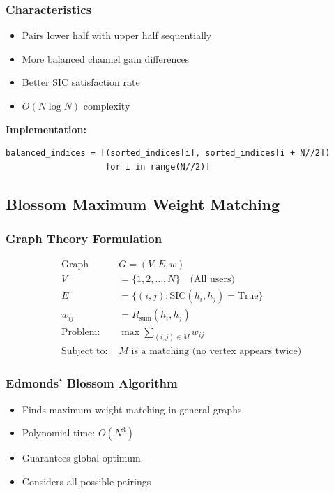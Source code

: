 \documentclass[12pt,a4paper]{article}
\begin{document}
\subsubsection{Characteristics}

\begin{itemize}
    \item Pairs lower half with upper half sequentially
    \item More balanced channel gain differences
    \item Better SIC satisfaction rate
    \item $O(N \log N)$ complexity
\end{itemize}

\textbf{Implementation:}
\begin{lstlisting}[caption={Balanced Clustering}]
balanced_indices = [(sorted_indices[i], sorted_indices[i + N//2]) 
                    for i in range(N//2)]
\end{lstlisting}

\subsection{Blossom Maximum Weight Matching}

\subsubsection{Graph Theory Formulation}

\begin{align}
\text{Graph } &G = (V, E, w) \\
V &= \{1, 2, \ldots, N\} \quad \text{(All users)} \\
E &= \{(i,j) : \text{SIC}(h_i, h_j) = \text{True}\} \\
w_{ij} &= R_{\text{sum}}(h_i, h_j) \\
\text{Problem: } &\max \sum_{(i,j) \in M} w_{ij} \\
\text{Subject to: } &M \text{ is a matching (no vertex appears twice)}
\end{align}

\subsubsection{Edmonds' Blossom Algorithm}

\begin{itemize}
    \item Finds maximum weight matching in general graphs
    \item Polynomial time: $O(N^3)$
    \item Guarantees global optimum
    \item Considers all possible pairings
\end{itemize}
\end{document}
